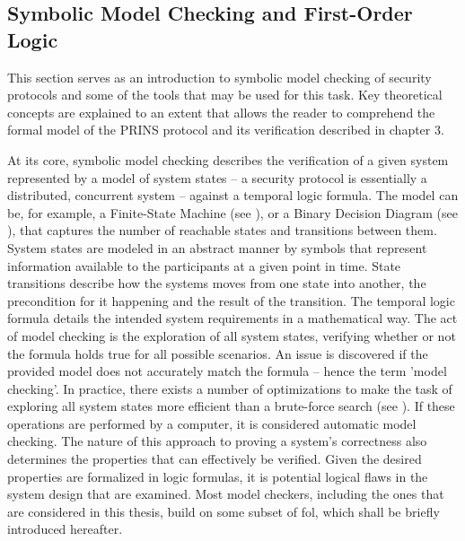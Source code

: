 \subsection{Symbolic Model Checking and First-Order Logic}

This section serves as an introduction to symbolic model checking of security protocols and some of the tools that may be used for this task.
Key theoretical concepts are explained to an extent that allows the reader to comprehend the formal model of the PRINS protocol and its verification described in chapter 3.


At its core, symbolic model checking describes the verification of a given system represented by a model of system states – a security protocol is essentially a distributed, concurrent system – against a temporal logic formula.
The model can be, for example, a Finite-State Machine (see \cite{alur1998model}), or a Binary Decision Diagram (see \cite{burch1992symbolic}), that captures the number of reachable states and transitions between them.
System states are modeled in an abstract manner by symbols that represent information available to the participants at a given point in time.
State transitions describe how the systems moves from one state into another, the precondition for it happening and the result of the transition.
The temporal logic formula details the intended system requirements in a mathematical way.
The act of model checking is the exploration of all system states, verifying whether or not the formula holds true for all possible scenarios.
An issue is discovered if the provided model does not accurately match the formula – hence the term 'model checking'.
In practice, there exists a number of optimizations to make the task of exploring all system states more efficient than a brute-force search (see \cite{etessami2000optimizing}).
If these operations are performed by a computer, it is considered automatic model checking.
The nature of this approach to proving a system's correctness also determines the properties that can effectively be verified.
Given the desired properties are formalized in logic formulas, it is potential logical flaws in the system design that are examined.
Most model checkers, including the ones that are considered in this thesis, build on some subset of \gls{fol}, which shall be briefly introduced hereafter.

